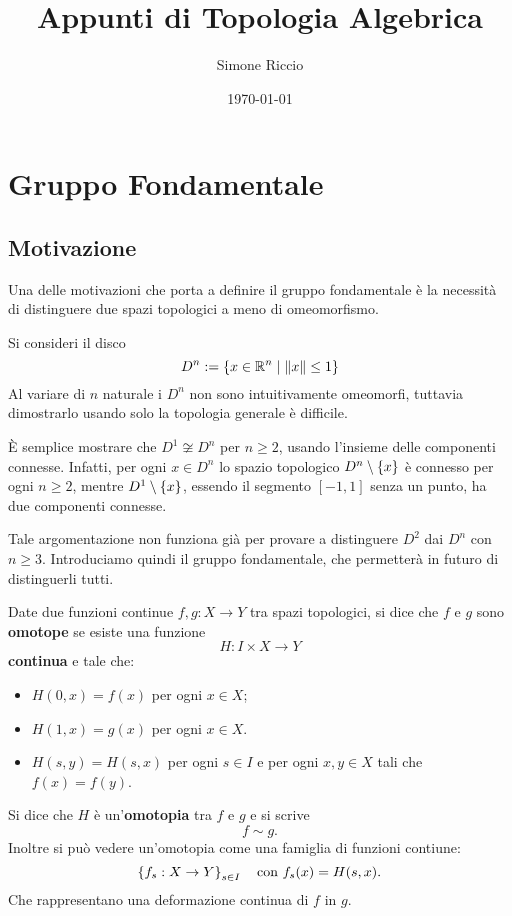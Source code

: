 \documentclass[]{article}
\begin{document}
\title{Appunti di Topologia Algebrica}
\author{Simone Riccio}
\date{\today}

\maketitle

\tableofcontents

\section{Gruppo Fondamentale}
\subsection{Motivazione}
    Una delle motivazioni che porta a definire il gruppo fondamentale è la necessità di distinguere
    due spazi topologici a meno di omeomorfismo.

    \begin{example} \nl
        Si consideri il disco 
        \[  
            D^n := \left\{  x \in \mathbb{R}^{n} \mid \left\| x \right\| \leq 1  \right\}
        \]
        Al variare di $n$ naturale i $D^n$ non sono intuitivamente omeomorfi, tuttavia dimostrarlo
        usando solo la topologia generale è difficile.

        È semplice mostrare che $D^1 \not\cong D^n$ per $n \geq 2$, usando l'insieme delle componenti 
        connesse. Infatti, per ogni $x \in D^n$ lo spazio topologico $D^n \setminus \left\{ x \right\}$ è connesso 
        per ogni $n \geq 2$, mentre $D^1 \setminus \left\{ x \right\}$, essendo il segmento $[-1,1]$ senza un punto, ha due componenti connesse.
    
        Tale argomentazione non funziona già per provare a distinguere $D^2$ dai $D^n$ con $n \geq 3$.
        Introduciamo quindi il gruppo fondamentale, che permetterà in futuro di distinguerli tutti.
    \end{example}

    \begin{definition}[Omotopia] \nl
        Date due funzioni continue $f,g: X \to Y$ tra spazi topologici, si dice che $f$ e $g$ sono \textbf{omotope} se esiste una funzione
        \[
            H: I \times X \to Y
        \]
        \textbf{continua} e tale che:
        \begin{itemize}
            \item $H(0,x) = f(x)$ per ogni $x \in X$;
            \item $H(1,x) = g(x)$ per ogni $x \in X$.
            \item $H(s,y) = H(s,x)$ per ogni $s \in I$ e per ogni $x,y \in X$ tali che $f(x) = f(y)$.
        \end{itemize}
        Si dice che $H$ è un'\textbf{omotopia} tra $f$ e $g$ e si scrive
        \[
            f \sim g.
        \]
        Inoltre si pu\`o vedere un'omotopia come una famiglia di funzioni contiune:
        \[
            \left\{ f_s: X \to Y \right\}_{s \in I}
            \quad \text{con } f_s(x) = H(s,x).
        \]
        Che rappresentano una deformazione continua di $f$ in $g$.
    \end{definition}
\end{document}
